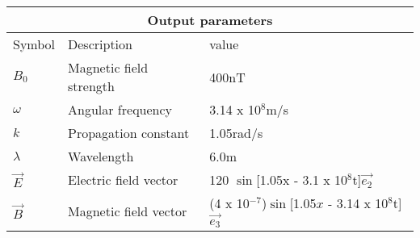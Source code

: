 \setlength{\arrayrulewidth}{0.3mm}
\setlength{\tabcolsep}{15pt}
\renewcommand{\arraystretch}{1.5}

\begin{center}
\begin{tabular}{ |p{1cm}|p{1cm}|p{4.5cm}|  }
\hline
\multicolumn{3}{|c|}{Output parameters} \\
\hline
Symbol& Description&value\\
\hline
$B_0$ & Magnetic field strength & 400nT\\
\hline
$\omega$ & Angular frequency & 3.14 x 10$^8$m/s\\
\hline
$k$ &Propagation constant & 1.05rad/s\\
\hline
$\lambda$ & Wavelength & 6.0m\\
\hline
$\vec{E}$ & Electric field vector & 120 $\sin$[1.05x - 3.1 x 10$^8$t]$\vec{e_2}$\\
\hline
$\vec{B}$ & Magnetic field vector & (4 x 10$^{-7}$)$\sin$[1.05$x$ - 3.14 x 10$^8$t]$\vec{e_3}$\\
\hline
\end{tabular}
\end{center}